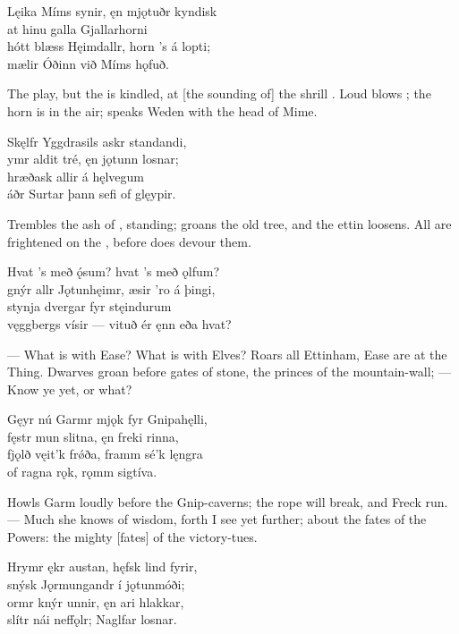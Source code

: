 \bva Lęika Míms synir, \hld ęn mjǫtuðr kyndisk \\%
at hinu galla \hld Gjallarhorni \\%
hótt blæss Hęimdallr, \hld horn ’s á lopti; \\%
mælir Óðinn \hld við Míms hǫfuð.\eva

\bvb The  play, but the  is kindled, at [the sounding of] the shrill . Loud blows ; the horn is in the air; speaks Weden with the head of Mime.\evb

\bva Skęlfr Yggdrasils \hld askr standandi, \\%
ymr aldit tré, \hld ęn jǫtunn losnar; \\%
hræðask allir \hld á hęlvegum \\%
áðr Surtar þann \hld sefi of glęypir.\eva

\bvb Trembles the ash of , standing; groans the old tree, and the ettin loosens. All are frightened on the , before  does devour them.\evb

\bva Hvat ’s með ǫ́sum? \hld hvat ’s með ǫlfum? \\%
gnýr allr Jǫtunhęimr, \hld æsir ’ro á þingi, \\%
stynja dvergar \hld fyr stęindurum \\%
vęggbergs vísir — \hld vituð ér ęnn eða hvat?\eva

\bvb — What is with Ease? What is with Elves? Roars all Ettinham, Ease are at the Thing. Dwarves groan before gates of stone, the princes of the mountain-wall; — Know ye yet, or what?\evb

\bva Gęyr nú Garmr mjǫk \hld fyr Gnipahęlli, \\%
fęstr mun slitna, \hld ęn freki rinna, \\%
fjǫlð vęit’k frǿða, \hld framm sé’k lęngra \\%
of ragna rǫk, \hld rǫmm sigtíva.\eva

\bvb Howls Garm loudly before the Gnip-caverns; the rope will break, and Freck run. — Much she knows of wisdom, forth I see yet further; about the fates of the Powers: the mighty [fates] of the victory-tues.\evb

\bva Hrymr ękr austan, \hld hęfsk lind fyrir, \\%
snýsk Jǫrmungandr \hld í jǫtunmóði; \\%
ormr knýr unnir, \hld ęn ari hlakkar, \\%
slítr nái neffǫlr; \hld Naglfar losnar.\eva

